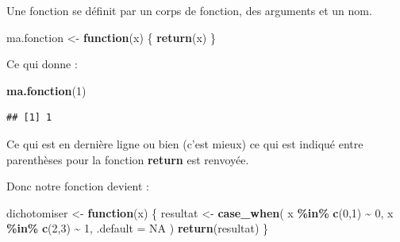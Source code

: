 \documentclass[
]{book}
\newenvironment{Shaded}{\begin{snugshade}}{\end{snugshade}}
\newcommand{\AttributeTok}[1]{\textcolor[rgb]{0.13,0.29,0.53}{#1}}
\newcommand{\ConstantTok}[1]{\textcolor[rgb]{0.56,0.35,0.01}{#1}}
\newcommand{\ControlFlowTok}[1]{\textcolor[rgb]{0.13,0.29,0.53}{\textbf{#1}}}
\newcommand{\DecValTok}[1]{\textcolor[rgb]{0.00,0.00,0.81}{#1}}
\newcommand{\FunctionTok}[1]{\textcolor[rgb]{0.13,0.29,0.53}{\textbf{#1}}}
\newcommand{\NormalTok}[1]{#1}
\newcommand{\OtherTok}[1]{\textcolor[rgb]{0.56,0.35,0.01}{#1}}
\newcommand{\SpecialCharTok}[1]{\textcolor[rgb]{0.81,0.36,0.00}{\textbf{#1}}}
\begin{document}
Une fonction se définit par un corps de fonction, des arguments et un nom.

\begin{Shaded}
\begin{Highlighting}[]
\NormalTok{ma.fonction }\OtherTok{\textless{}{-}} \ControlFlowTok{function}\NormalTok{(x) \{}
  \FunctionTok{return}\NormalTok{(x)}
\NormalTok{\}}
\end{Highlighting}
\end{Shaded}

Ce qui donne :

\begin{Shaded}
\begin{Highlighting}[]
\FunctionTok{ma.fonction}\NormalTok{(}\DecValTok{1}\NormalTok{)}
\end{Highlighting}
\end{Shaded}

\begin{verbatim}
## [1] 1
\end{verbatim}

Ce qui est en dernière ligne ou bien (c'est mieux) ce qui est indiqué entre parenthèses
pour la fonction \textbf{return} est renvoyée.

Donc notre fonction devient :

\begin{Shaded}
\begin{Highlighting}[]
\NormalTok{dichotomiser }\OtherTok{\textless{}{-}} \ControlFlowTok{function}\NormalTok{(x) \{}
\NormalTok{  resultat }\OtherTok{\textless{}{-}} \FunctionTok{case\_when}\NormalTok{(}
\NormalTok{      x }\SpecialCharTok{\%in\%} \FunctionTok{c}\NormalTok{(}\DecValTok{0}\NormalTok{,}\DecValTok{1}\NormalTok{) }\SpecialCharTok{\textasciitilde{}} \DecValTok{0}\NormalTok{,}
\NormalTok{      x }\SpecialCharTok{\%in\%} \FunctionTok{c}\NormalTok{(}\DecValTok{2}\NormalTok{,}\DecValTok{3}\NormalTok{) }\SpecialCharTok{\textasciitilde{}} \DecValTok{1}\NormalTok{,}
      \AttributeTok{.default =} \ConstantTok{NA}
\NormalTok{  )}
  \FunctionTok{return}\NormalTok{(resultat)}
\NormalTok{\}}
\end{Highlighting}
\end{Shaded}

\begin{Shaded}
\end{Shaded}
\end{document}
